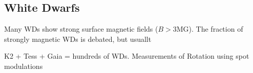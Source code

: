 {\color{red} \subsection{White Dwarfs}}
Many WDs show strong surface magnetic fields ($B>$3MG). The fraction of strongly magnetic WDs is debated, but usuallt  

K2 + Tess + Gaia = hundreds of WDs. Measurements of Rotation using spot modulations